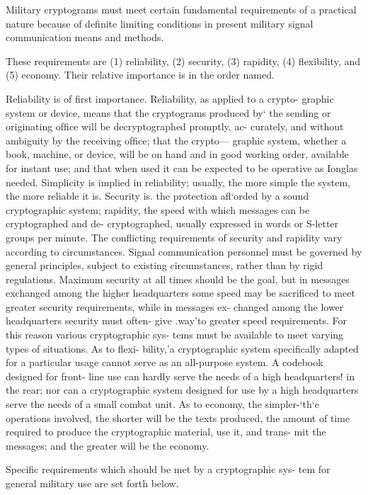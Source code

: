 \mypara Military cryptograms must meet certain fundamental requirements
of a practical nature because of deﬁnite limiting conditions in present
military signal communication means and methods.

\mypara These requirements are (1) reliability, (2) security, (3) rapidity,
(4) ﬂexibility, and (5) economy. Their relative importance is in the
order named.

\mypara Reliability is of ﬁrst importance. Reliability, as applied to a crypto-
graphic system or device, means that the cryptograms produced by‘ the
sending or originating ofﬁce will be decryptographed promptly, ac-
curately, and without ambiguity by the receiving ofﬁce; that the crypto—
graphic system, whether a book, machine, or device, will be on hand and
in good working order, available for instant use; and that when used it
can be expected to be operative as Ionglas needed. Simplicity is implied
in reliability; usually, the more simple the system, the more reliable it is.
Security is. the protection aﬂ‘orded by a sound cryptographic system;
rapidity, the speed with which messages can be cryptographed and de-
cryptographed, usually expressed in words or S-letter groups per minute.
The conﬂicting requirements of security and rapidity vary according to
circumstances. Signal communication personnel must be governed by
general principles, subject to existing circumstances, rather than by rigid
regulations. Maximum security at all times should be the goal, but in
messages exchanged among the higher headquarters some speed may be
sacriﬁced to meet greater security requirements, while in messages ex-
changed among the lower headquarters security must often- give .way'to
greater speed requirements. For this reason various cryptographic sys-
tems must be available to meet varying types of situations. As to ﬂexi-
bility,'a cryptographic system speciﬁcally adapted for a particular usage
cannot serve as an all-purpose system. A codebook designed for front-
line use can hardly serve the needs of a high headquarters! in the rear;
nor can a cryptographic system designed for use by a high headquarters
serve the needs of a small combat unit. As to economy, the simpler-‘th‘e
operations involved, the shorter will be the texts produced, the amount
of time required to produce the cryptographic material, use it, and trans-
mit the messages; and the greater will be the economy.

\mypara Specific requirements which should be met by a cryptographic sys-
tem for general military use are set forth below.

